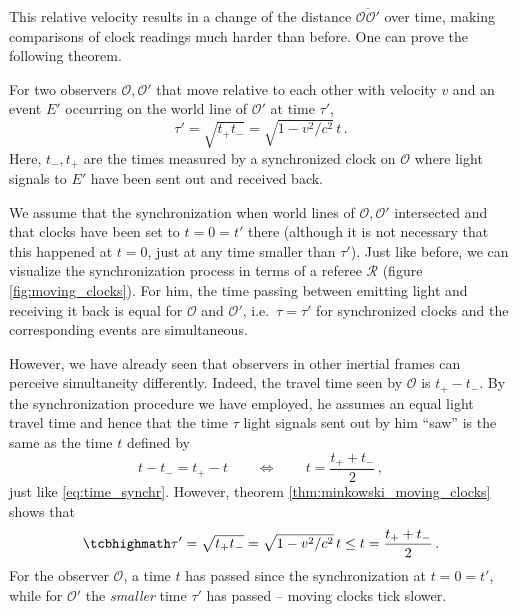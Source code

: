 This relative velocity results in a change of the distance $\overline{\mathcal{O} \mathcal{O}'}$ over time, making comparisons of clock readings much harder than before. One can prove the following theorem.
\begin{thm}\label{thm:minkowski_moving_clocks}
	For two observers $\mathcal{O}, \mathcal{O}'$ that move relative to each other with velocity $v$ and an event $E'$ occurring on the world line of $\mathcal{O}'$ at time $\tau'$,
	\begin{equation}
	\tau' = \sqrt{t_+ t_-} = \sqrt{1 - v^2 / c^2} \, t \, .
	\end{equation}
	Here, $t_-, t_+$ are the times measured by a synchronized clock on $\mathcal{O}$ where light signals to $E'$ have been sent out and received back.
\end{thm}
We assume that the synchronization when world lines of $\mathcal{O}, \mathcal{O}'$ intersected and that clocks have been set to $t = 0 = t'$ there (although it is not necessary that this happened at $t = 0$, just at any time smaller than $\tau'$). Just like before, we can visualize the synchronization process in terms of a referee $\mathcal{R}$ (figure \ref{fig:moving_clocks}). For him, the time passing between emitting light and receiving it back is equal for $\mathcal{O}$ and $\mathcal{O}'$, i.e.~$\tau = \tau'$ for synchronized clocks and the corresponding events are simultaneous.

However, we have already seen that observers in other inertial frames can perceive simultaneity differently. Indeed, the travel time seen by $\mathcal{O}$ is $t_+ - t_-$. By the synchronization procedure we have employed, he assumes an equal light travel time and hence that the time $\tau$ light signals sent out by him \enquote{saw} is the same as the time $t$ defined by
\begin{equation*}
t - t_- = t_+ - t
\qquad \Leftrightarrow \qquad
t = \frac{t_+ + t_-}{2}
\, ,
\end{equation*}
just like \eqref{eq:time_synchr}. However, theorem \ref{thm:minkowski_moving_clocks} shows that
\begin{equation}
\eqbox{
\tau' = \sqrt{t_+ t_-} = \sqrt{1 - v^2 / c^2} \, t \leq t = \frac{t_+ + t_-}{2}
} \, .
\end{equation}
For the observer $\mathcal{O}$, a time $t$ has passed since the synchronization at $t = 0 = t'$, while for $\mathcal{O}'$ the \emph{smaller} time $\tau'$ has passed -- moving clocks tick slower.



